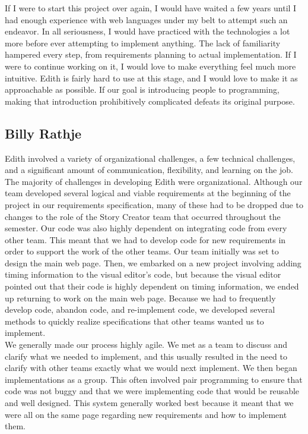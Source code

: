 \documentclass[12pt]{article}
\begin{document}
If I were to start this project over again, I would have waited a few years until I had enough experience with web languages under my belt to attempt such an endeavor. In all seriousness, I would have practiced with the technologies a lot more before ever attempting to implement anything. The lack of familiarity hampered every step, from requirements planning to actual implementation. If I were to continue working on it, I would love to make everything feel much more intuitive. Edith is fairly hard to use at this stage, and I would love to make it as approachable as possible. If our goal is introducing people to programming, making that introduction prohibitively complicated defeats its original purpose.


\subsection{Billy Rathje}

Edith involved a variety of organizational challenges, a few technical challenges, and a significant amount of communication, flexibility, and learning on the job. \\ 

The majority of challenges in developing Edith were organizational. Although our team developed several logical and viable requirements at the beginning of the project in our requirements specification, many of these had to be dropped due to changes to the role of the Story Creator team that occurred throughout the semester. Our code was also highly dependent on integrating code from every other team. This meant that we had to develop code for new requirements in order to support the work of the other teams. Our team initially was set to design the main web page. Then, we embarked on a new project involving adding timing information to the visual editor's code, but because the visual editor pointed out that their code is highly dependent on timing information, we ended up returning to work on the main web page. Because we had to frequently develop code, abandon code, and re-implement code, we developed several methods to quickly realize specifications that other teams wanted us to implement. \\

We generally made our process highly agile. We met as a team to discuss and clarify what we needed to implement, and this usually resulted in the need to clarify with other teams exactly what we would next implement. We then began implementations as a group. This often involved pair programming to ensure that code was not buggy and that we were implementing code that would be reusable and well designed. This system generally worked best because it meant that we were all on the same page regarding new requirements and how to implement them. \\
\end{document}
